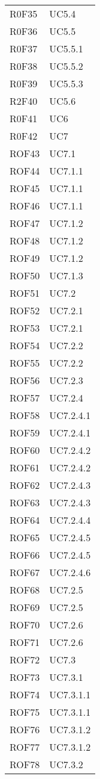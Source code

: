 \documentclass[../AnalisiDeiRequisiti.tex]{subfiles}
\begin{document}
\begin{longtable}{p{4cm}!{\VRule[1pt]}p{4cm}}
R0F35 & UC5.4 \\
R0F36 & UC5.5 \\
R0F37 & UC5.5.1 \\
R0F38 & UC5.5.2 \\
R0F39 & UC5.5.3 \\
R2F40 & UC5.6 \\
R0F41 & UC6 \\
R0F42 & UC7 \\
ROF43 & UC7.1 \\
ROF44 & UC7.1.1 \\
ROF45 & UC7.1.1 \\
ROF46 & UC7.1.1 \\
ROF47 & UC7.1.2 \\
ROF48 & UC7.1.2 \\
ROF49 & UC7.1.2 \\
ROF50 & UC7.1.3 \\
ROF51 & UC7.2 \\
ROF52 & UC7.2.1 \\
ROF53 & UC7.2.1 \\
ROF54 & UC7.2.2 \\
ROF55 & UC7.2.2 \\
ROF56 & UC7.2.3 \\
ROF57 & UC7.2.4 \\
ROF58 & UC7.2.4.1 \\
ROF59 & UC7.2.4.1 \\
ROF60 & UC7.2.4.2 \\
ROF61 & UC7.2.4.2 \\
ROF62 & UC7.2.4.3 \\
ROF63 & UC7.2.4.3 \\
ROF64 & UC7.2.4.4 \\
ROF65 & UC7.2.4.5 \\
ROF66 & UC7.2.4.5 \\
ROF67 & UC7.2.4.6 \\
ROF68 & UC7.2.5 \\
ROF69 & UC7.2.5 \\
ROF70 & UC7.2.6 \\
ROF71 & UC7.2.6 \\
ROF72 & UC7.3 \\
ROF73 & UC7.3.1 \\
ROF74 & UC7.3.1.1 \\
ROF75 & UC7.3.1.1 \\
ROF76 & UC7.3.1.2 \\
ROF77 & UC7.3.1.2 \\
ROF78 & UC7.3.2 \\

\end{longtable}
\end{document}
